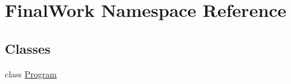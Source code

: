 \hypertarget{namespace_final_work}{}\section{Final\+Work Namespace Reference}
\label{namespace_final_work}
\subsection*{Classes}
\begin{DoxyCompactItemize}
\item 
class \hyperlink{class_final_work_1_1_program}{Program}
\end{DoxyCompactItemize}
